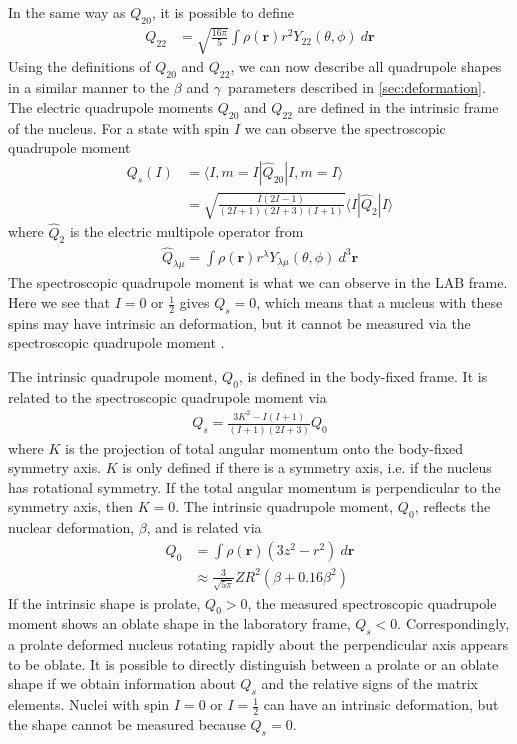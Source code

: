 \documentclass[twoside,english]{uiofysmaster/uiofysmaster}
\newcommand{\ga}{$\gamma$}
\let\orgautoref\autoref
\renewcommand{\autoref}
        {%
		 \def\sectionautorefname{Section}%
		 \def\subsectionautorefname{Section}%
		 \def\subsubsectionautorefname{Section}%
		 \def\chapterautorefname{Chapter}%
          \orgautoref}
\begin{document}
In the same way as $Q_{20}$, it is possible to define 
\begin{align}
	Q_{22} &= \sqrt{\frac{16\pi}{5}} \int \rho(\mathbf{r}) r^2 Y_{22}(\theta, \phi) ~d \mathbf{r}
\end{align}
Using the definitions of $Q_{20}$ and $Q_{22}$, we can now describe all quadrupole shapes in a similar manner to the $\beta$ and \ga\ parameters described in \autoref{sec:deformation}.
The electric quadrupole moments $Q_{20}$ and $Q_{22}$ are defined in the intrinsic frame of the nucleus.
For a state with spin $I$ we can observe the spectroscopic quadrupole moment
\begin{align}
	Q_s(I) &= \langle I, m = I | \hat{Q}_{20} | I, m = I \rangle \\
	&= \sqrt{\frac{I(2I - 1)}{(2I + 1)(2I + 3)(I + 1)}} \langle I | \hat{Q}_2 | I \rangle
\end{align}
where $\hat{Q}_2$ is the electric multipole operator \cite{RS} from
\begin{align}
	\hat{Q}_{\lambda \mu} = \int \rho(\mathbf{r}) r^\lambda Y_{\lambda \mu}(\theta, \phi) ~d^3 \mathbf{r}
\end{align}
The spectroscopic quadrupole moment is what we can observe in the LAB frame.
Here we see that $I = 0$ or $\tfrac{1}{2}$ gives $Q_s = 0$, which means that a nucleus with these spins may have intrinsic an deformation, but it cannot be measured via the spectroscopic quadrupole moment \cite{ELP}.  

The intrinsic quadrupole moment, $Q_0$, is defined in the body-fixed frame.
It is related to the spectroscopic quadrupole moment via
\begin{align}
	Q_s = \frac{3K^2 - I(I+1)}{(I+1)(2I+3)} Q_0
\end{align}
where $K$ is the projection of total angular momentum onto the body-fixed symmetry axis.
$K$ is only defined if there is a symmetry axis, i.e. if the nucleus has rotational symmetry.
If the total angular momentum is perpendicular to the symmetry axis, then $K = 0$.
The intrinsic quadrupole moment, $Q_0$, reflects the nuclear deformation, $\beta$, and is related via \cite{Klintefjord, LOBNER1970}
\begin{align}
	Q_0 &= \int \rho(\mathbf{r}) (3z^2 - r^2) ~d \mathbf{r} \nonumber \\
	&\approx \frac{3}{\sqrt{5\pi}} Z R^2 (\beta + 0.16 \beta^2)
\end{align}
If the intrinsic shape is prolate, $Q_0 > 0$, the measured spectroscopic quadrupole moment shows an oblate shape in the laboratory frame, $Q_s < 0$.
Correspondingly, a prolate deformed nucleus rotating rapidly about the perpendicular axis appears to be oblate.
It is possible to directly distinguish between a prolate or an oblate shape if we obtain information about $Q_s$ and the relative signs of the matrix elements. 
Nuclei with spin $I = 0$ or $I = \tfrac{1}{2}$ can have an intrinsic deformation, but the shape cannot be measured because $Q_s = 0$. 
\end{document}
